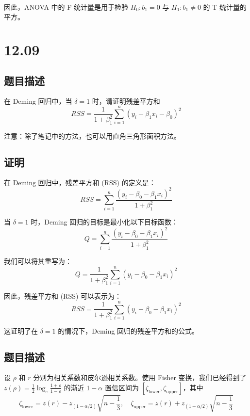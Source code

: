 \documentclass[UTF8]{article}
\theoremstyle{MyLineTheoremStyle} %
\theoremstyle{MyBlockTheoremStyle} %
\theoremstyle{MySubsubsectionStyle} %
\begin{document}
因此，ANOVA 中的 F 统计量是用于检验 $H_0: b_1 = 0$ 与 $H_1: b_1 \neq 0$ 的 T 统计量的平方。




\cleardoublepage

\section{12.09}



\subsection*{题目描述}

在 Deming 回归中，当 $\delta = 1$ 时，请证明残差平方和
\[
RSS = \frac{1}{1 + \beta_1^2} \sum_{i=1}^{n} (y_i - \beta_1 x_i - \beta_0)^2
\]

注意：除了笔记中的方法，也可以用直角三角形面积方法。

\subsection*{证明}

在 Deming 回归中，残差平方和 (RSS) 的定义是：
\[
RSS = \sum_{i=1}^{n} \frac{(y_i - \beta_0 - \beta_1 x_i)^2}{1 + \beta_1^2}
\]

当 $\delta = 1$ 时，Deming 回归的目标是最小化以下目标函数：
\[
Q = \sum_{i=1}^{n} \frac{(y_i - \beta_0 - \beta_1 x_i)^2}{1 + \beta_1^2}
\]

我们可以将其重写为：
\[
Q = \frac{1}{1 + \beta_1^2} \sum_{i=1}^{n} (y_i - \beta_0 - \beta_1 x_i)^2
\]

因此，残差平方和 (RSS) 可以表示为：
\[
RSS = \frac{1}{1 + \beta_1^2} \sum_{i=1}^{n} (y_i - \beta_0 - \beta_1 x_i)^2
\]

这证明了在 $\delta = 1$ 的情况下，Deming 回归的残差平方和的公式。



\subsection*{题目描述}
设 $\rho$ 和 $r$ 分别为相关系数和皮尔逊相关系数。使用 Fisher 变换，我们已经得到了 $z(\rho) = \frac{1}{2} \log_e \frac{1+\rho}{1-\rho}$ 的渐近 $1 - \alpha$ 置信区间为 $[\zeta_{\text{lower}}, \zeta_{\text{upper}}]$，其中
\[
\zeta_{\text{lower}} = z(r) - z_{(1-\alpha/2)}\sqrt{n - \frac{1}{3}}, \quad \zeta_{\text{upper}} = z(r) + z_{(1-\alpha/2)}\sqrt{n - \frac{1}{3}}
\]
\end{document}
